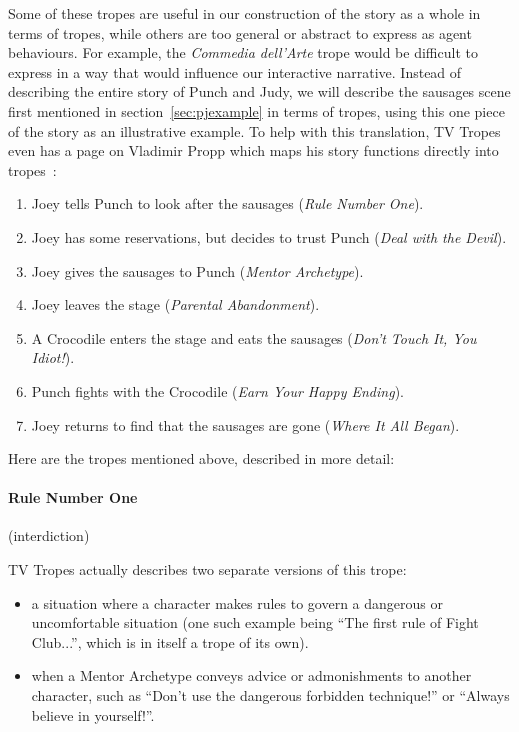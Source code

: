 \documentclass[11pt]{report}
\begin{document}
Some of these tropes are useful in our construction of the story as a whole in
terms of tropes, while others are too general or abstract to express as agent behaviours. For example, the \emph{Commedia
  dell'Arte} trope would be difficult to express in a way that would influence
our interactive narrative. Instead of describing the entire story of Punch and
Judy, we will describe the sausages scene first mentioned in
section~\ref{sec:pjexample} in terms of tropes, using this one piece of the
story as an illustrative example. To help with this translation,
TV Tropes even has a page on Vladimir Propp which maps his story functions
directly into tropes~\citep{propp-tropes}:

\begin{enumerate}
  \item Joey tells Punch to look after the sausages (\emph{Rule Number One}).
  \item Joey has some reservations, but decides to trust Punch (\emph{Deal with
      the Devil}).
  \item Joey gives the sausages to Punch (\emph{Mentor Archetype}).
  \item Joey leaves the stage (\emph{Parental Abandonment}).
  \item A Crocodile enters the stage and eats the sausages (\emph{Don't Touch
      It, You Idiot!}).
  \item Punch fights with the Crocodile (\emph{Earn Your Happy Ending}).
  \item Joey returns to find that the sausages are gone (\emph{Where It All Began}).
\end{enumerate}

Here are the tropes mentioned above, described in more detail:

\paragraph{Rule Number One} (interdiction)

TV Tropes actually describes two separate versions of this trope:

\begin{itemize}
  \item a situation where a character makes rules to govern a dangerous or
    uncomfortable situation (one such example being ``The first rule of Fight
    Club...'', which is in itself a trope of its own).
  \item when a Mentor Archetype conveys advice or admonishments to another
    character, such as ``Don't use the dangerous forbidden technique!'' or
    ``Always believe in yourself!''.
\end{itemize}
\end{document}
